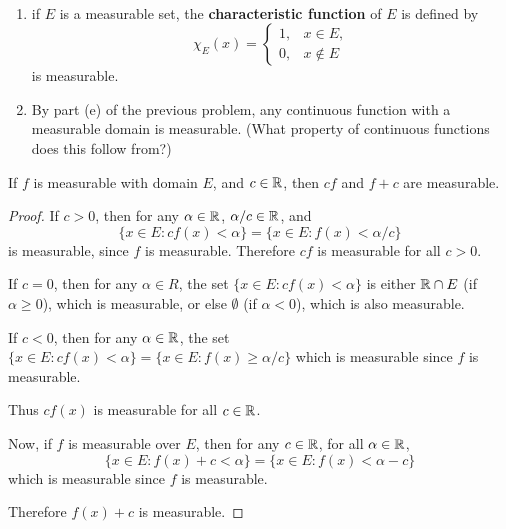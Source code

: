 \begin{ex}%
~
\begin{enumerate}
	\item if $E$ is a measurable set, the \textbf{characteristic function} 
	of $E$ is defined by 
	\begin{equation*}
		\chi_E (x) = 
	\left\{ \begin{matrix} 
		1, & x \in E, \\
		0, & x \notin E
	\end{matrix} \right.
	\end{equation*}
	is measurable. 
	\item By part (e) of the previous problem, any continuous function with a 
	measurable domain is measurable. (What property of continuous functions 
	does this follow from?) 
\end{enumerate}
\end{ex}

\pagebreak
\begin{pblm}%
	If $f$ is measurable with domain $E$, and $c \in \mathbb{R}$, then $cf$ and 
	$f + c$ are measurable. 
\begin{proof}
	If $c > 0$, then for any $\alpha \in \mathbb{R}$, $\alpha /c \in \mathbb{R}$, and 
	\begin{equation*}
		\{x \in E: cf(x) < \alpha\} = \{x \in E: f(x) < \alpha/c\}
	\end{equation*}
	is measurable, since $f$ is measurable. Therefore $cf$ is measurable for all 
	$c > 0$. 

	If $c = 0$, then for any $\alpha \in R$, 
	the set $\{x \in E: cf(x) < \alpha\}$ is either $\mathbb{R}\cap E$ 
	(if $\alpha \ge 0$), which is measurable, or else $\emptyset$ (if $\alpha < 0$), 
	which is also measurable. 

	If $c < 0$, then for any $\alpha \in \mathbb{R}$, the set $\{x \in E: cf(x) < \alpha\} = 
	\{x \in E: f(x) \ge \alpha / c\}$ which is measurable since $f$ is measurable. 

	Thus $cf(x)$ is measurable for all $c \in \mathbb{R}$.

	Now, if $f$ is measurable over $E$, then for any $c \in \mathbb{R}$, for all $\alpha \in \mathbb{R}$, 
	\begin{equation*}
		\{x \in E: f(x) + c < \alpha\} = \{x \in E: f(x) < \alpha - c\}
	\end{equation*}
	which is measurable since $f$ is measurable. 

	Therefore $f(x) + c$ is measurable. 
\end{proof}
\end{pblm}

